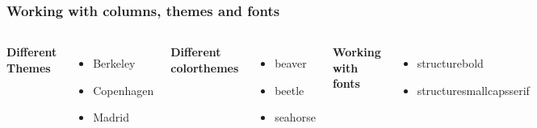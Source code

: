 \documentclass{beamer}
\begin{document}
\begin{frame}
\frametitle{Working with columns, themes and fonts}
\begin{columns}
\textbf{Different Themes}
\begin{itemize}
\item Berkeley
\item Copenhagen
\item Madrid
\end{itemize}
\textbf{Different colorthemes}
\begin{itemize}
\item beaver
\item beetle
\item seahorse
\end{itemize}
\textbf{Working with fonts}
\begin{itemize}
\item structurebold
\item structuresmallcapsserif
\end{itemize}
\end{columns}
\end{frame}
\end{document}
